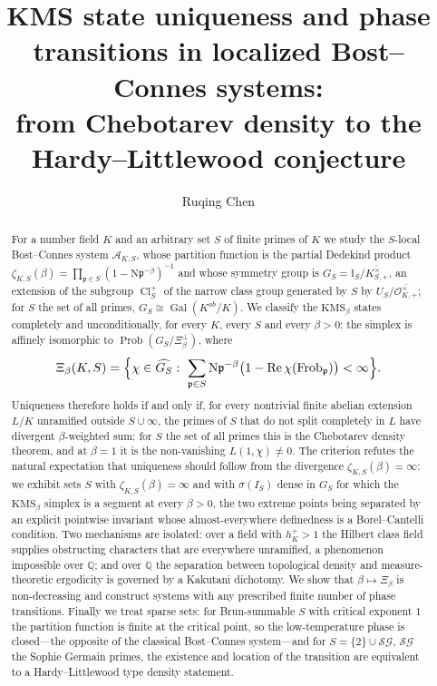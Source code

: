 \documentclass[11pt]{amsart}
\title[KMS uniqueness in localized Bost--Connes systems]{KMS state uniqueness and phase transitions in localized Bost--Connes systems:\\ from Chebotarev density to the Hardy--Littlewood conjecture}
\author{Ruqing Chen}
\date{}
\numberwithin{equation}{section}
\theoremstyle{definition}
\theoremstyle{remark}
\newcommand{\Q}{\mathbb{Q}}
\newcommand{\Prob}{\operatorname{Prob}}
\newcommand{\Gal}{\operatorname{Gal}}
\newcommand{\Cl}{\operatorname{Cl}}
\newcommand{\Frob}{\operatorname{Frob}}
\newcommand{\Ns}{\mathrm{N}}
\newcommand{\cA}{\mathcal{A}}
\newcommand{\cO}{\mathcal{O}}
\newcommand{\Idl}{\mathbb{I}}
\newcommand{\pp}{\mathfrak{p}}
\newcommand{\SG}{\mathcal{SG}}
\begin{document}
\begin{abstract}
For a number field $K$ and an arbitrary set $S$ of finite primes of $K$ we
study the $S$-local Bost--Connes system $\cA_{K,S}$, whose partition function
is the partial Dedekind product $\zeta_{K,S}(\beta)=\prod_{\pp\in S}(1-\Ns\pp^{-\beta})^{-1}$
and whose symmetry group is $G_S=\Idl_S/\overline{K^\times_{S,+}}$, an
extension of the subgroup $\Cl^+_S$ of the narrow class group generated by $S$
by $U_S/\overline{\cO^\times_{K,+}}$; for $S$ the set of all primes,
$G_S\cong\Gal(K^{ab}/K)$. We classify the $\mathrm{KMS}_\beta$ states
completely and unconditionally, for every $K$, every $S$ and every $\beta>0$:
the simplex is affinely isomorphic to $\Prob(G_S/\Xi_\beta^\perp)$, where
\[
\Xi_\beta(K,S)=\Bigl\{\chi\in\widehat{G_S}:\ \sum_{\pp\in S}\Ns\pp^{-\beta}\bigl(1-\operatorname{Re}\chi(\Frob_\pp)\bigr)<\infty\Bigr\}.
\]
Uniqueness therefore holds if and only if, for every nontrivial finite abelian
extension $L/K$ unramified outside $S\cup\infty$, the primes of $S$ that do not
split completely in $L$ have divergent $\beta$-weighted sum; for $S$ the set of
all primes this is the Chebotarev density theorem, and at $\beta=1$ it is the
non-vanishing $L(1,\chi)\neq0$. The criterion refutes the natural
expectation that uniqueness should follow from the divergence
$\zeta_{K,S}(\beta)=\infty$: we exhibit sets $S$ with
$\zeta_{K,S}(\beta)=\infty$ and with $\sigma(I_S)$ dense in $G_S$ for which the
$\mathrm{KMS}_\beta$ simplex is a segment at every $\beta>0$, the two extreme
points being separated by an explicit pointwise invariant whose almost-everywhere
definedness is a Borel--Cantelli condition. Two mechanisms are isolated: over a
field with $h^+_K>1$ the Hilbert class field supplies obstructing characters
that are everywhere unramified, a phenomenon impossible over $\Q$; and over
$\Q$ the separation between topological density and measure-theoretic
ergodicity is governed by a Kakutani dichotomy. We show that $\beta\mapsto\Xi_\beta$
is non-decreasing and construct systems with any prescribed finite number of
phase transitions. Finally we treat sparse sets: for Brun-summable $S$ with
critical exponent $1$ the partition function is finite at the critical point,
so the low-temperature phase is closed---the opposite of the classical
Bost--Connes system---and for $S=\{2\}\cup\SG$, $\SG$ the Sophie Germain
primes, the existence and location of the transition are equivalent to a
Hardy--Littlewood type density statement.
\end{abstract}
\end{document}
